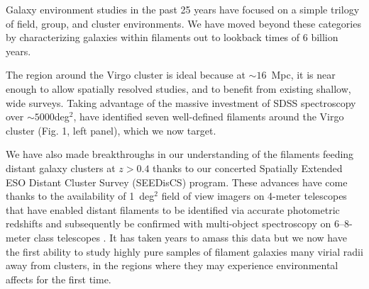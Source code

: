 \documentclass[11pt]{article}
\begin{document}
  Galaxy environment studies in the past 25 years have focused on a simple trilogy of field, group, and cluster environments.  We have moved beyond these categories by characterizing galaxies within filaments out to lookback times of 6 billion years.

The region around the Virgo cluster is ideal because at $\sim 16$~Mpc,  it is near enough to allow spatially resolved studies, and to benefit from existing shallow, wide surveys. Taking advantage of the massive investment of SDSS spectroscopy over $\sim 5000$deg$^2$, \citet{Kim16} have identified seven well-defined filaments around the Virgo cluster (Fig. 1, left panel), which we now target.

We have also made breakthroughs in our understanding of the filaments feeding distant galaxy clusters at $z>0.4$ thanks to our concerted Spatially Extended ESO Distant Cluster Survey (SEEDisCS) program.  These advances have come thanks to the availability of 1~deg$^{2}$ field of view imagers on 4-meter telescopes that have enabled distant filaments to be identified via accurate photometric redshifts and subsequently be confirmed with multi-object spectroscopy on 6--8-meter class telescopes \citep[Fig. 1, right pax`nel;][]{Rerat17}.  It has taken years to amass this data but we now have the first ability to study highly pure samples of filament galaxies many virial radii away from clusters, in the regions where they may experience environmental affects for the first time.
\end{document}
